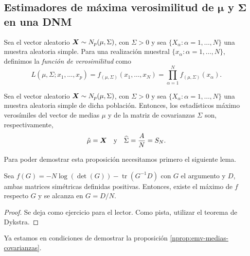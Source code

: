 \subsection{Estimadores de máxima verosimilitud de \texorpdfstring{$\boldsymbol \mu$}{mu} y \texorpdfstring{$\boldsymbol \Sigma$}{sigma} en una DNM}

\begin{ndef}
  Sea el vector aleatorio $\boldsymbol{X} \sim N_p(\mu,\Sigma)$, con $\Sigma > 0$ y sea $\{X_\alpha : \alpha =1,\dots,N \}$ una muestra aleatoria simple.
  Para una realización muestral $\{ x_\alpha : \alpha = 1, \dots, N\}$, definimos la \textit{función de verosimilitud} como
  \[
  L(\mu,\Sigma;x_1,\dots,x_p) = f_{(\mu,\Sigma)}(x_1,\dots,x_N) = \prod_{\alpha = 1}^N f_{(\mu,\Sigma)}(x_\alpha).
  \]

\end{ndef}

\begin{nprop}
  \label{nprop:emv-medias-covarianzas}
  Sea el vector aleatorio $\boldsymbol{X} \sim N_p(\mu,\Sigma)$, con $\Sigma> 0$ y sea $\{ X_\alpha : \alpha = 1,\dots, N\}$ una muestra aleatoria simple de dicha población. 
  Entonces, los estadísticos máximo verosímiles del vector de medias $\mu$ y de la matriz de covarianzas $\Sigma$ son, respectivamente,
  \[
  \hat{\mu} = \boldsymbol{X} \quad \text{y} \quad \widehat{\Sigma} = \frac{A}{N} = S_N.
  \]
\end{nprop}

Para poder demostrar esta proposición necesitamos primero el siguiente lema.

\begin{lema}
  \label{lema:watson}
  Sea $f(G) = -N \log(\det(G)) - \operatorname{tr}(G^{-1}D)$ con $G$ el argumento y $D$, ambas matrices simétricas definidas positivas. Entonces, existe el máximo de $f$ respecto $G$ y se alcanza en $G = D/N$.
\end{lema}

\begin{proof}
  Se deja como ejercicio para el lector. Como pista, utilizar el teorema de Dykstra.
\end{proof}

Ya estamos en condiciones de demostrar la proposición \ref{nprop:emv-medias-covarianzas}.

